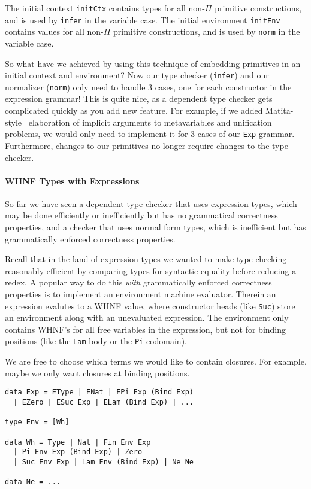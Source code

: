 \documentclass[preprint,authoryear]{sigplanconf}
\begin{document}
The initial context \texttt{initCtx} contains types for all
non-$\Pi$ primitive constructions, and is used by \texttt{infer} in the
variable case.
The initial environment \texttt{initEnv} contains values for all
non-$\Pi$ primitive constructions, and is used by \texttt{norm} in the
variable case.

So what have we achieved by using this technique of embedding primitives
in an initial context and environment? Now our type checker
(\texttt{infer}) and our normalizer (\texttt{norm}) only need to
handle 3 cases, one for each constructor in the expression grammar!
This is quite nice, as a dependent type checker gets complicated
quickly as you add new feature. For example, if we added
Matita-style~\cite{TODO} elaboration of implicit arguments to
metavariables and unification problems, we would only need to
implement it for 3 cases of our \texttt{Exp} grammar.
Furthermore, changes to our primitives no longer require changes to
the type checker.

\paragraph{WHNF Types with Expressions}

So far we have seen a dependent type checker that uses
expression types, which may be done efficiently or inefficiently but
has no grammatical correctness properties, and a checker that uses
normal form types, which is inefficient but has grammatically enforced
correctness properties.

Recall that in the land of expression types we wanted to
make type checking reasonably efficient by
comparing types for syntactic equality before reducing a redex.
A popular way to do this {\it with} grammatically enforced correctness
properties is to implement an environment machine evaluator. Therein
an expression evalutes to a WHNF value, where constructor heads
(like \texttt{Suc}) store an environment along with an unevaluated
expression. The environment only contains WHNF's for all free
variables in the expression, but not for binding positions (like the
\texttt{Lam} body or the \texttt{Pi} codomain).

We are free to choose which terms we would like to contain closures.
For example, maybe we only want closures at binding positions. 

\begin{verbatim}
data Exp = EType | ENat | EPi Exp (Bind Exp)
  | EZero | ESuc Exp | ELam (Bind Exp) | ...

type Env = [Wh]

data Wh = Type | Nat | Fin Env Exp
  | Pi Env Exp (Bind Exp) | Zero
  | Suc Env Exp | Lam Env (Bind Exp) | Ne Ne

data Ne = ...
\end{verbatim}
\end{document}
